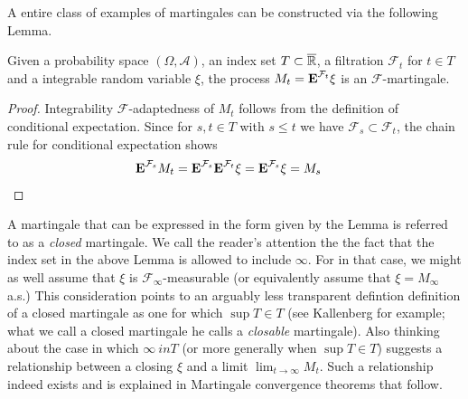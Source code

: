 A entire class of examples of martingales can be constructed via the
following Lemma.  
\begin{lem}\label{ClosedMartingales}Given a probability space $(\Omega,  \mathcal{A})$, an
  index set $T \subset \overline{\mathbb{R}}$, a
  filtration $\mathcal{F}_t$ for $t \in T$ and a integrable random
  variable $\xi$, the process $M_t = \textbf{E}^{\mathcal{F}_t} \xi$ is
  an $\mathcal{F}$-martingale.
\end{lem}
\begin{proof}Integrability $\mathcal{F}$-adaptedness of $M_t$ follows from the definition of
  conditional expectation.  Since for $s,t \in T$ with $s \leq t$ we
  have $\mathcal{F}_s \subset \mathcal{F}_t$, the chain rule for
  conditional expectation shows 
\begin{align*}
\textbf{E}^{\mathcal{F}_s} M_t &=
\textbf{E}^{\mathcal{F}_s} \textbf{E}^{\mathcal{F}_t} \xi =
\textbf{E}^{\mathcal{F}_s} \xi = M_s
\end{align*}
\end{proof}
A martingale that can be expressed in the form given by the Lemma is
referred to as a \emph{closed} martingale.  We call the reader's attention the the fact
that the index set in the above Lemma is allowed to include $\infty$.
For in that case, we might as well assume that $\xi$ is
$\mathcal{F}_\infty$-measurable (or equivalently assume that $\xi =
M_\infty$ a.s.)  This consideration points to an
arguably less transparent defintion
definition of a closed martingale as one for which $\sup T \in T$ (see
Kallenberg for example; what we call a closed martingale he calls a
\emph{closable} martingale).  Also thinking about the case  in which
$\infty \ in T$ (or more generally when $\sup T \in T$) suggests a
relationship between a closing $\xi$ and a limit $\lim_{t \to \infty}
M_t$.  Such a relationship indeed exists and is explained in
Martingale convergence theorems that follow.

